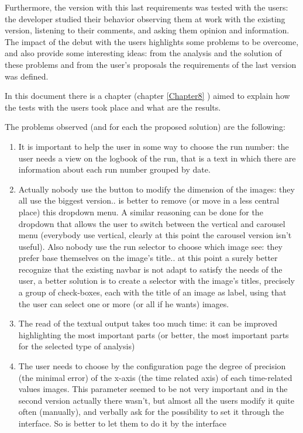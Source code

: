 Furthermore, the version with this last requirements was tested with the users: the developer studied their behavior observing them at work with the existing version, listening to their comments, and asking them opinion and information. The impact of the debut with the users highlights some problems to be overcome, and also provide some interesting ideas: from the analysis and the solution of these problems and from the user's proposals the requirements of the last version was defined. 

In this document there is a chapter (chapter \ref{Chapter8} ) aimed to explain how the tests with the users took place and what are the results.

The problems observed (and for each the proposed solution) are the following:

\begin{enumerate}
\item 
It is important to help the user in some way to choose the run number: the user needs a view on the logbook of the run, that is a text in which there are information about each run number grouped by date.

\item
Actually nobody use the button to modify the dimension of the images: they all use the biggest version.. is better to remove (or move in a less central place) this dropdown menu. A similar reasoning can be done for the dropdown that allows the user to switch between the vertical and carousel menu (everybody use vertical, clearly at this point the carousel version isn't useful). Also nobody use the run selector to choose which image see: they prefer base themselves on the image's title.. at this point a surely better recognize that the existing navbar is not adapt to satisfy the needs of the user, a better solution is to create a selector with the image's titles, precisely a group of check-boxes, each with the title of an image as label, using that the user can select one or more (or all if he wants) images.  

\item
The read of the textual output takes too much time: it can be improved highlighting the most important parts (or better, the most important parts for the selected type of analysis)

\item
The user needs to choose by the configuration page the degree of precision (the minimal error) of the x-axis (the time related axis) of each time-related values images. This parameter seemed to be not very important and in the second version actually there wasn't, but almost all the users modify it quite often (manually), and verbally ask for the possibility to set it through the interface. So is better to let them to do it by the interface

\end{enumerate}

